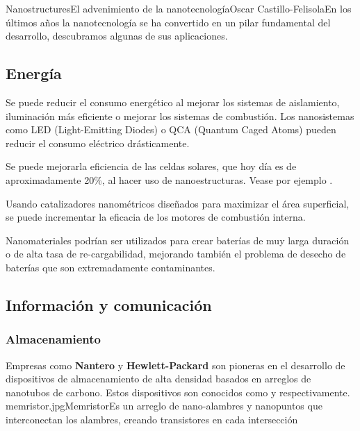 \begin{article}{Nanostructures}{El advenimiento de la nanotecnolog\'ia}{Oscar Castillo-Felisola}{En los \'ultimos a\~nos la nanotecnolog\'ia se ha convertido en un pilar fundamental del desarrollo, descubramos algunas de sus aplicaciones.}
\subsection{Energ\'ia}
Se puede reducir el consumo energ\'etico al mejorar los sistemas de aislamiento, iluminaci\'on m\'as eficiente o mejorar los sistemas de combusti\'on. Los nanosistemas como LED (Light-Emitting Diodes) o QCA (Quantum Caged Atoms) pueden reducir el consumo el\'ectrico dr\'asticamente.

Se puede mejorarla eficiencia de las celdas solares, que hoy d\'ia es de aproximadamente 20\%, al hacer uso de nanoestructuras. Vease por ejemplo .

Usando catalizadores nanom\'etricos dise\~nados para maximizar el \'area superficial, se puede incrementar la eficacia de los motores de combusti\'on interna.

Nanomateriales podr\'ian ser utilizados para crear bater\'ias de  muy larga duraci\'on o de alta tasa de re-cargabilidad, mejorando tambi\'en el problema de desecho de bater\'ias que son extremadamente contaminantes.



\subsection{Informaci\'on y comunicaci\'on}
\subsubsection*{Almacenamiento}
Empresas como {\bf Nantero} y {\bf Hewlett-Packard} son pioneras en el desarrollo de dispositivos de almacenamiento de alta densidad basados en arreglos de nanotubos de carbono. Estos dispositivos son conocidos como  y  respectivamente.
\Bild%
    {memristor.jpg}{Memristor}{Es un arreglo de nano-alambres y nanopuntos que interconectan los alambres, creando transistores en cada intersecci\'on}


\end{article}
